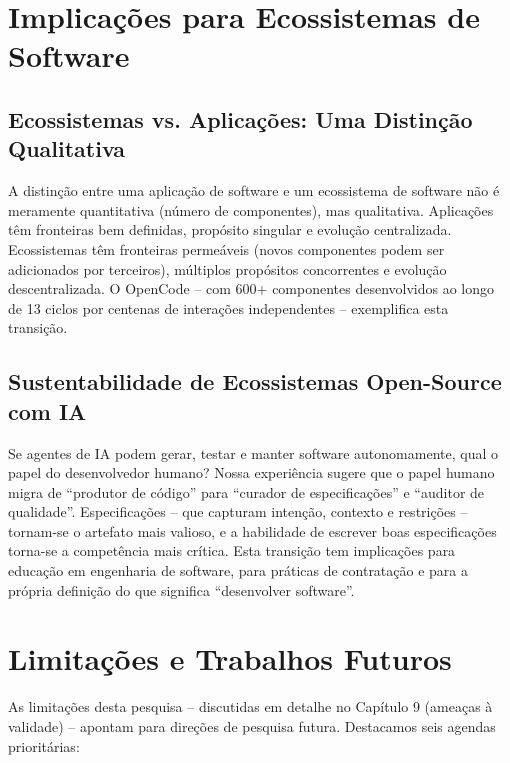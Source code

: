 \documentclass[12pt,a4paper,sumario=tradicional,openany]{abntex2}
\begin{document}
\section{Implicações para Ecossistemas de Software}

\subsection{Ecossistemas vs. Aplicações: Uma Distinção Qualitativa}

A distinção entre uma aplicação de software e um ecossistema de software não é meramente quantitativa (número de componentes), mas qualitativa. Aplicações têm fronteiras bem definidas, propósito singular e evolução centralizada. Ecossistemas têm fronteiras permeáveis (novos componentes podem ser adicionados por terceiros), múltiplos propósitos concorrentes e evolução descentralizada. O OpenCode -- com 600+ componentes desenvolvidos ao longo de 13 ciclos por centenas de interações independentes -- exemplifica esta transição.

\subsection{Sustentabilidade de Ecossistemas Open-Source com IA}

Se agentes de IA podem gerar, testar e manter software autonomamente, qual o papel do desenvolvedor humano? Nossa experiência sugere que o papel humano migra de ``produtor de código'' para ``curador de especificações'' e ``auditor de qualidade''. Especificações -- que capturam intenção, contexto e restrições -- tornam-se o artefato mais valioso, e a habilidade de escrever boas especificações torna-se a competência mais crítica. Esta transição tem implicações para educação em engenharia de software, para práticas de contratação e para a própria definição do que significa ``desenvolver software''.

\section{Limitações e Trabalhos Futuros}

As limitações desta pesquisa -- discutidas em detalhe no Capítulo 9 (ameaças à validade) -- apontam para direções de pesquisa futura. Destacamos seis agendas prioritárias:
\end{document}
